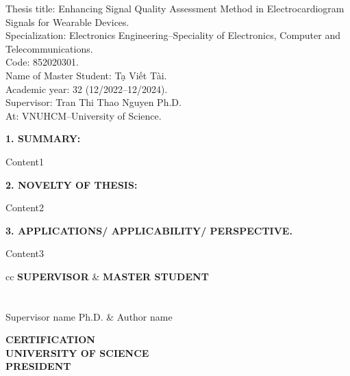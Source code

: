 \begin{flushleft}
	Thesis title: Enhancing Signal Quality Assessment Method in Electrocardiogram Signals for Wearable Devices. \\
	Specialization: Electronics Engineering--Speciality of Electronics, Computer and Telecommunications. \\
	Code: 852020301. \\
	Name of Master Student: Tạ Viết Tài. \\
	Academic year: 32 (12/2022--12/2024). \\
	Supervisor: Tran Thi Thao Nguyen Ph.D.\\
	At: VNUHCM--University of Science.\\
\end{flushleft}

\textbf{1. SUMMARY:}

Content1

\textbf{2. NOVELTY OF THESIS:}

Content2

\textbf{3. APPLICATIONS/ APPLICABILITY/ PERSPECTIVE.}

Content3


\vspace{1.5em}
\begin{tblr}{cc}
	\centering
	\textbf{SUPERVISOR}   & \textbf{\hspace{8.0em}MASTER STUDENT} \\
	\\
	\\
	Supervisor name Ph.D. & \hspace{8.0em} Author name
\end{tblr}

\vspace{2.5em}
\begin{center}
	\textbf{CERTIFICATION}\\
	\textbf{UNIVERSITY OF SCIENCE} \\
	\textbf{PRESIDENT}
\end{center}